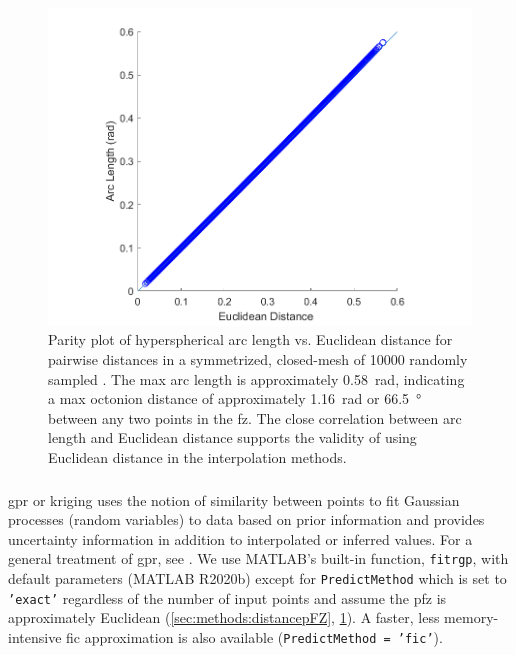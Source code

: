 \documentclass[preprint,12pt]{elsarticle}
\begin{document}
\begin{figure}
\centering
\includegraphics[width=0.5\linewidth]{dist-parity.png}
\caption{Parity plot of hyperspherical arc length vs. Euclidean distance for pairwise distances in a symmetrized, closed-mesh of \num{10000} randomly sampled . The max arc length is approximately \SI{0.58}{\radian}, indicating a max octonion distance of approximately \SI{1.16}{\radian} or \SI{66.5}{\degree} between any two points in the \acrlong{fz}. The close correlation between arc length and Euclidean distance supports the validity of using Euclidean distance in the interpolation methods.}
\label{fig:dist-parity}
\end{figure}

\subsubsection{}


\Gls{gpr} or kriging uses the notion of similarity between points to fit Gaussian processes (random variables) to data based on prior information and provides uncertainty information in addition to interpolated or inferred values. For a general treatment of \gls{gpr}, see \cite{rasmussenGaussianProcessesMachine2006}. We use MATLAB's built-in function, \texttt{fitrgp}, with default parameters (MATLAB R2020b) except for \texttt{PredictMethod} which is set to \texttt{'exact'} regardless of the number of input points and assume the \gls{pfz} is approximately Euclidean (\cref{sec:methods:distancepFZ}, \cref{fig:dist-parity}). A faster, less memory-intensive \gls{fic} approximation is also available (\texttt{PredictMethod = 'fic'}).
\end{document}
